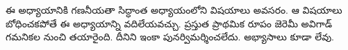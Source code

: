 \documentclass[../../../include/open-logic-chapter]{subfiles}
\begin{document}
\begin{editorial}
  ఈ అధ్యాయానికి గణనీయతా సిద్ధాంత అధ్యాయంలోని విషయాలు అవసరం. ఆ విషయాలు
  బోధించకపోతే ఈ అధ్యాయాన్ని వదిలేయవచ్చు. ప్రస్తుత ప్రాథమిక రూపం జెరెమీ అవిగాడ్
  గమనికల నుంచి తయారైంది. దీనిని ఇంకా పునర్విమర్శించలేదు. అభ్యాసాలు కూడా లేవు.
\end{editorial}












\OLEndChapterHook
\end{document}
